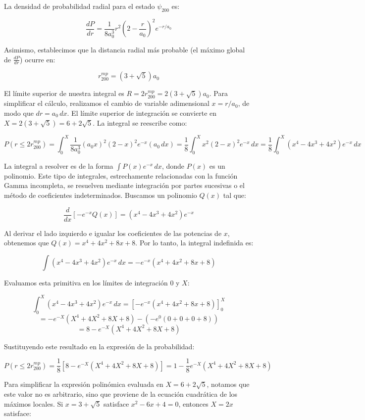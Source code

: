 \documentclass[a4paper]{article}
\begin{document}
\begin{enumerate}[a)]
La densidad de probabilidad radial para el estado $\psi_{200}$ es:

$$ \frac{dP}{dr} = \frac{1}{8a_0^3} r^2 \left( 2 - \frac{r}{a_0} \right)^2 e^{-r/a_0} $$

Asimismo, establecimos que la distancia radial más probable (el máximo global de $\frac{dP}{dr}$) ocurre en:

$$ r_{200}^{mp} = (3 + \sqrt{5})a_0 $$

El límite superior de nuestra integral es $R = 2r_{200}^{mp} = 2(3 + \sqrt{5})a_0$. Para simplificar el cálculo, realizamos el cambio de variable adimensional $x = r/a_0$, de modo que $dr = a_0 \, dx$. El límite superior de integración se convierte en $X = 2(3 + \sqrt{5}) = 6 + 2\sqrt{5}$. La integral se reescribe como:

$$ P(r \leq 2r_{200}^{mp}) = \int_{0}^{X} \frac{1}{8a_0^3} (a_0 x)^2 (2 - x)^2 e^{-x} (a_0 \, dx) = \frac{1}{8} \int_{0}^{X} x^2 (2 - x)^2 e^{-x} \, dx  = \frac{1}{8} \int_{0}^{X} (x^4 - 4x^3 + 4x^2)e^{-x} \, dx$$

La integral a resolver es de la forma $\int P(x) e^{-x} \, dx$, donde $P(x)$ es un polinomio. Este tipo de integrales, estrechamente relacionadas con la función Gamma incompleta, se resuelven mediante integración por partes sucesivas o el método de coeficientes indeterminados. Buscamos un polinomio $Q(x)$ tal que:

$$ \frac{d}{dx} \left[ -e^{-x} Q(x) \right] = (x^4 - 4x^3 + 4x^2) e^{-x} $$

Al derivar el lado izquierdo e igualar los coeficientes de las potencias de $x$, obtenemos que $Q(x) = x^4 + 4x^2 + 8x + 8$. Por lo tanto, la integral indefinida es:

$$ \int (x^4 - 4x^3 + 4x^2) e^{-x} \, dx = -e^{-x} (x^4 + 4x^2 + 8x + 8) $$

Evaluamos esta primitiva en los límites de integración $0$ y $X$:

$$ \int_{0}^{X} (x^4 - 4x^3 + 4x^2) e^{-x} \, dx = \left[ -e^{-x} (x^4 + 4x^2 + 8x + 8) \right]_0^X $$
$$ = -e^{-X} (X^4 + 4X^2 + 8X + 8) - \left( -e^{0} (0 + 0 + 0 + 8) \right) $$
$$ = 8 - e^{-X} (X^4 + 4X^2 + 8X + 8) $$

Sustituyendo este resultado en la expresión de la probabilidad:

$$ P(r \leq 2r_{200}^{mp}) = \frac{1}{8} \left[ 8 - e^{-X} (X^4 + 4X^2 + 8X + 8) \right] = 1 - \frac{1}{8} e^{-X} (X^4 + 4X^2 + 8X + 8) $$

Para simplificar la expresión polinómica evaluada en $X = 6 + 2\sqrt{5}$, notamos que este valor no es arbitrario, sino que proviene de la ecuación cuadrática de los máximos locales. Si $x = 3 + \sqrt{5}$ satisface $x^2 - 6x + 4 = 0$, entonces $X = 2x$ satisface:


\end{enumerate}
\end{document}
